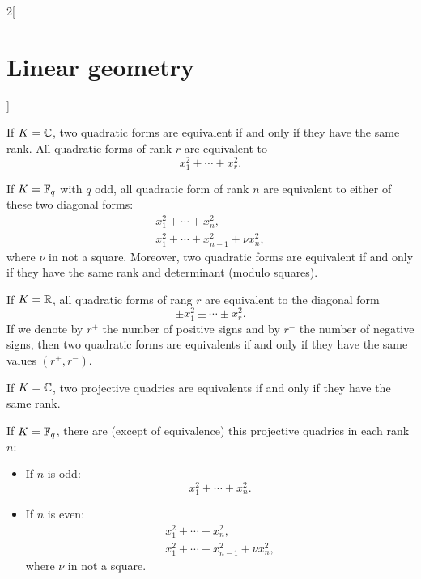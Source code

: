 \documentclass[../../../main.tex]{subfiles}
\begin{document}
\begin{multicols}{2}[\section{Linear geometry}]
\begin{proposition}
  \end{proposition}
  \begin{theorem}
    If $K=\mathbb{C} $, two quadratic forms are equivalent if and only if they have the same rank. All quadratic forms of rank $r$ are equivalent to $$x_1^2+\cdots+x_r^2.$$
  \end{theorem}
  \begin{theorem}
    If $K=\mathbb{F}_q$ with $q$ odd, all quadratic form
    of rank $n$ are equivalent to either of these two diagonal forms:
    \begin{gather*}
      x_1^2+\cdots+ x_n^2,\\
      x_1^2+\cdots+ x_{n-1}^2+\nu x_n^2,
    \end{gather*}
    where $\nu$ in not a square. Moreover, two quadratic forms are equivalent if and only if they have the same rank and determinant (modulo squares).
  \end{theorem}
  \begin{theorem}
    If $K=\mathbb{R} $, all quadratic forms
    of rang $r$ are equivalent to the diagonal form
    $$\pm x_1^2\pm\cdots\pm x_r^2.$$ If we denote by $r^+$ the number of positive signs and by $r^-$ the number of negative signs, then two quadratic forms are equivalents if and only if they have the same values $(r^+,r^-)$.
  \end{theorem}
  \begin{theorem}
    If $K=\mathbb{C} $, two projective quadrics are equivalents if and only if they have the same rank.
  \end{theorem}
  \begin{theorem}
    If $K=\mathbb{F}_q$, there are (except of equivalence) this projective quadrics in each rank $n$:
    \begin{itemize}
      \item If $n$ is odd: $$\displaystyle x_1^2+\cdots+ x_n^2.$$
      \item If $n$ is even: \begin{gather*}
              x_1^2+\cdots+ x_n^2,\\
              x_1^2+\cdots+ x_{n-1}^2+\nu x_n^2,
            \end{gather*}
            where $\nu$ in not a square.
    \end{itemize}
  \end{theorem}

\end{multicols}
\end{document}
